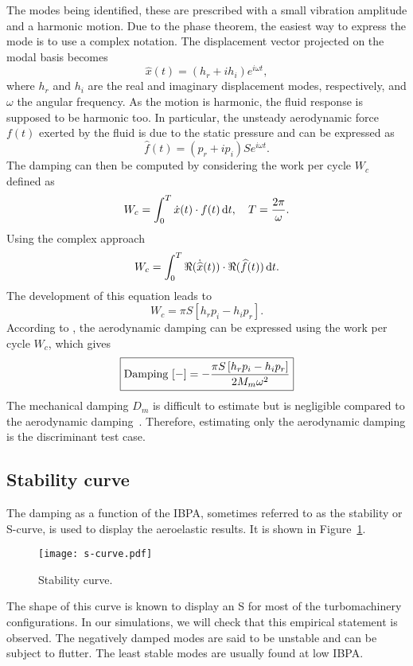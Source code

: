 The modes being identified, these are prescribed
with a small vibration amplitude and a harmonic motion.
Due to the phase theorem, the easiest way to express
the mode is to use a complex notation.
The displacement vector projected on the modal basis becomes
\begin{equation}
   \widehat{x}(t) = (h_r + i h_i) e^{i \omega t},
   \label{eq:harm_vib_displ_vector}
\end{equation}
where $h_r$ and $h_i$ are the real and imaginary displacement
modes, respectively, and $\omega$ the angular frequency.
As the motion is harmonic, the fluid response is
supposed to be harmonic too.
In particular, the unsteady aerodynamic 
force $f (t)$ exerted by the fluid is due to the
static pressure and can be expressed as
\begin{equation}
    \widehat{f}(t) = (p_r + i p_i) S e^{i \omega t}.
\end{equation}
The damping can then be computed by considering the 
work per cycle $W_c$ defined as
\begin{equation}
    W_c = \int_0^T \dot{x} (t) \cdot f(t) \mathop{}\!\mathrm{d} t, \quad T = \frac{2 \pi}{\omega}.
\end{equation}
Using the complex approach
\begin{equation}
    W_c = \int_0^T \Re (\dot{\widehat{x}} (t)) \cdot \Re (\widehat{f}(t)) \mathop{}\!\mathrm{d} t.
\end{equation}
The development of this equation leads to
\begin{equation}
    W_c = \pi S \left[h_r p_i - h_i p_r \right].
\end{equation}
According to \citet{Carta1967}, the aerodynamic 
damping can be expressed using the
work per cycle $W_c$, which gives
\begin{equation}
    \fbox{$
    \textrm{Damping } [-] = - \displaystyle \frac{\pi S \left[h_r p_i - h_i p_r \right]}{2 M_m \omega^2}
    $}
\end{equation}
The mechanical damping $D_m$ is difficult to estimate
but is negligible compared to the aerodynamic damping~\cite{Mikolajczak1975}.
Therefore, estimating only the aerodynamic damping is the discriminant test case.

\subsection{Stability curve}
\label{sub:s_curve}

The damping as a function of the IBPA, sometimes
referred to as the stability or S-curve, is used to
display the aeroelastic results. It is shown in
Figure~\ref{fig:s-curve}. 
\begin{figure}[htp]
  \centering
  \texttt{[image: s-curve.pdf]}
  \caption{Stability curve.}
  \label{fig:s-curve}
\end{figure}
The shape of this curve is
known to display an S for most of the
turbomachinery configurations. 
In our simulations, we will check that this empirical
statement is observed.
The negatively damped modes are said to
be unstable and can be subject to flutter. 
The least stable modes are usually found at low IBPA.

